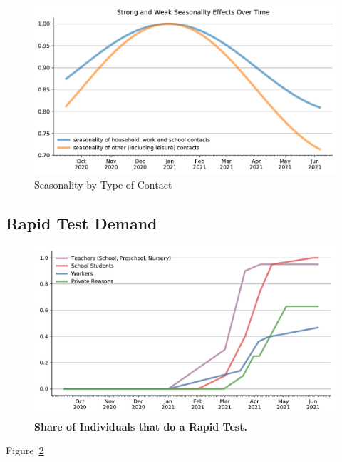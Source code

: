 \begin{figure}
    \centering
    \includegraphics[width=\textwidth]{../figures/results/figures/data/seasonality}
    \caption{Seasonality by Type of Contact}
    \label{fig:seasonality}
    \floatfoot{\noindent}
\end{figure}



\FloatBarrier

\subsection{Rapid Test Demand}


\begin{figure}
    \centering
    \includegraphics[width=\textwidth]{../figures/results/figures/data/testing/rapid_test_demand_shares}
    \caption{\textbf{Share of Individuals that do a Rapid Test.}}
    \label{fig:rapid_test_demand}
\end{figure}

Figure~\ref{fig:rapid_test_demand}


